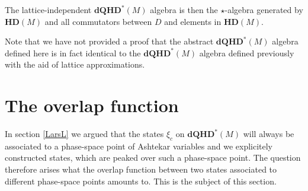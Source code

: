 \documentclass[12pt]{article}
\begin{document}
 
 The lattice-independent $\mathbf{dQHD}^*(M)$ algebra is then the $\star$-algebra generated by $\mathbf{HD}(M)$ and all commutators between $D$ and elements in $\mathbf{HD}(M)$. 
 
 
 

Note that we have not provided a proof that the abstract $\mathbf{dQHD}^*(M)$ algebra defined here is in fact identical to the $\mathbf{dQHD}^*(M)$ algebra defined previously with the aid of lattice approximations. 

















\section{The overlap function}
\label{overlap}


In section \ref{LarsL} we argued that the states $\xi_c$ on $\mathbf{dQHD}^*(M)$ will always be associated to a phase-space point of Ashtekar variables and we explicitely constructed states, which are peaked over such a phase-space point. The question therefore arises what the overlap function between two states associated to different phase-space points amounts to. This is the subject of this section. 
\end{document}
